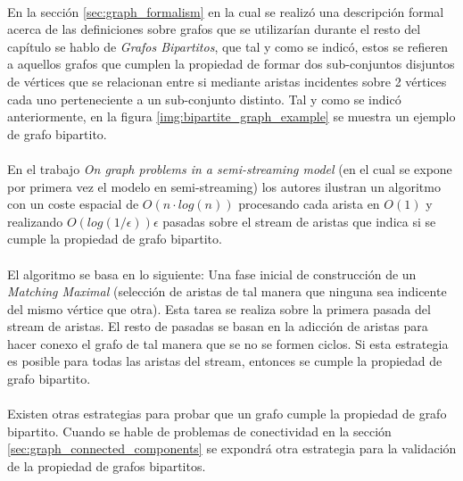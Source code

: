 \documentclass{subfiles}
\begin{document}
        \paragraph{}
        En la sección \ref{sec:graph_formalism} en la cual se realizó una descripción formal acerca de las definiciones sobre grafos que se utilizarían durante el resto del capítulo se hablo de \emph{Grafos Bipartitos}, que tal y como se indicó, estos se refieren a aquellos grafos que cumplen la propiedad de formar dos sub-conjuntos disjuntos de vértices que se relacionan entre si mediante aristas incidentes sobre 2 vértices cada uno perteneciente a un sub-conjunto distinto. Tal y como se indicó anteriormente, en la figura \ref{img:bipartite_graph_example} se muestra un ejemplo de grafo bipartito.

        \paragraph{}
        En el trabajo \emph{On graph problems in a semi-streaming model}\cite{feigenbaum2005graph} (en el cual se expone por primera vez el modelo en semi-streaming) los autores ilustran un algoritmo con un coste espacial de $O(n \cdot log(n))$ procesando cada arista en $O(1)$ y realizando $O(log(1 / \epsilon)) \epsilon$ pasadas sobre el stream de aristas que indica si se cumple la propiedad de grafo bipartito.

        \paragraph{}
        El algoritmo se basa en lo siguiente: Una fase inicial de construcción de un \emph{Matching Maximal} (selección de aristas de tal manera que ninguna sea indicente del mismo vértice que otra). Esta tarea se realiza sobre la primera pasada del stream de aristas. El resto de pasadas se basan en la adicción de aristas para hacer conexo el grafo de tal manera que se no se formen ciclos. Si esta estrategia es posible para todas las aristas del stream, entonces se cumple la propiedad de grafo bipartito.

        \paragraph{}
        Existen otras estrategias para probar que un grafo cumple la propiedad de grafo bipartito. Cuando se hable de problemas de conectividad en la sección \ref{sec:graph_connected_components} se expondrá otra estrategia para la validación de la propiedad de grafos bipartitos.
\end{document}
